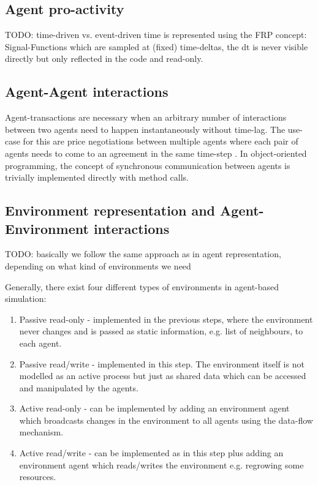 \subsection{Agent pro-activity}
TODO: time-driven vs. event-driven 
time is represented using the FRP concept: Signal-Functions which are sampled at (fixed) time-deltas, the dt is never visible directly but only reflected in the code and read-only.

\subsection{Agent-Agent interactions}
Agent-transactions are necessary when an arbitrary number of interactions between two agents need to happen instantaneously without time-lag. The use-case for this are price negotiations between multiple agents where each pair of agents needs to come to an agreement in the same time-step \cite{epstein_growing_1996}. In object-oriented programming, the concept of synchronous communication between agents is trivially implemented directly with method calls.

\subsection{Environment representation and Agent-Environment interactions}
TODO: basically we follow the same approach as in agent representation, depending on what kind of environments we need

Generally, there exist four different types of environments in agent-based simulation:
\begin{enumerate}
	\item Passive read-only - implemented in the previous steps, where the environment never changes and is passed as static information, e.g. list of neighbours, to each agent.
	\item Passive read/write - implemented in this step. The environment itself is not modelled as an active process but just as shared data which can be accessed and manipulated by the agents.
	\item Active  read-only - can be implemented by adding an environment agent which broadcasts changes in the environment to all agents using the data-flow mechanism.
	\item Active read/write - can be implemented as in this step plus adding an environment agent which reads/writes the environment e.g. regrowing some resources.
\end{enumerate}


